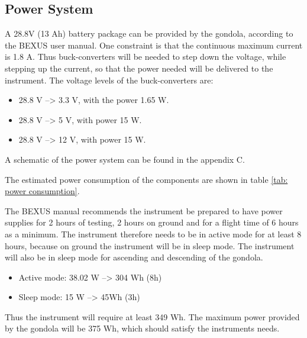 \pagebreak
\subsection{Power System}

\label{sec:4.7}

A 28.8V (13 Ah) battery package can be provided by the gondola, according to the BEXUS user manual. One constraint is that the continuous maximum current is 1.8 A. Thus buck-converters will be needed to step down the voltage, while stepping up the current, so that the power needed will be delivered to the instrument. The voltage levels of the buck-converters are:

\begin{itemize}
	\item 28.8 V --> 3.3 V, with the power 1.65 W.
	\item 28.8 V --> 5 V, with power 15 W.
	\item 28.8 V --> 12 V, with power 15 W.
\end{itemize}

A schematic of the power system can be found in the appendix C.

The estimated power consumption of the components are shown in table \ref{tab: power consumption}.




The BEXUS manual recommends the instrument be prepared to have power supplies for 2 hours of testing, 2 hours on ground and for a flight time of 6 hours as a minimum. The instrument therefore needs to be in active mode for at least 8 hours, because on ground the instrument will be in sleep mode. The instrument will also be in sleep mode for ascending and descending of the gondola. 


\begin{itemize}
    \item Active mode: 38.02 W  --> 304 Wh (8h)
    \item Sleep mode: 15 W --> 45Wh (3h)
\end{itemize}

Thus the instrument will require at least 349 Wh. The maximum power provided by the gondola will be 375 Wh, which should satisfy the instruments needs.


\raggedbottom
